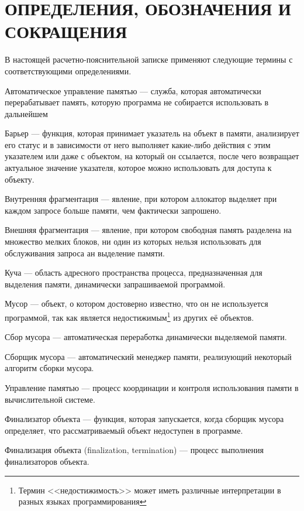 \part*{ОПРЕДЕЛЕНИЯ, ОБОЗНАЧЕНИЯ И\\СОКРАЩЕНИЯ}
В настоящей расчетно-пояснительной записке применяют следующие термины с соответствующими определениями.

\begin{enumdescript}
	\item[Автоматическое управление памятью] --- служба, которая автоматически перерабатывает память, которую программа не собирается использовать в дальнейшем
	\item[Барьер] --- функция, которая принимает указатель на объект в памяти, анализирует его статус и в зависимости от него выполняет какие-либо действия с этим указателем или даже с объектом, на который он ссылается, после чего возвращает актуальное значение указателя, которое можно использовать для доступа к объекту.
	\item[Внутренняя фрагментация] --- явление, при котором аллокатор выделяет при каждом запросе больше памяти, чем фактически запрошено.
	\item[Внешняя фрагментация] --- явление, при котором свободная память разделена на множество мелких блоков, ни один из которых нельзя использовать для обслуживания запроса ан выделение памяти.
	\item[Куча] --- область адресного пространства процесса, предназначенная для выделения памяти, динамически запрашиваемой программой.
	\item[Мусор] --- объект, о котором достоверно известно, что он не используется программой, так как является недостижимым\footnote{Термин <<недостижимость>> может иметь различные интерпретации в разных языках программирования} из других её объектов.
	\item[Сбор мусора] --- автоматическая переработка динамически выделяемой памяти.
	\item[Сборщик мусора] --- автоматический менеджер памяти, реализующий некоторый алгоритм сборки мусора.
	\item[Управление памятью] --- процесс координации и контроля использования памяти в вычислительной системе.
	\item[Финализатор объекта] --- функция, которая запускается, когда сборщик мусора определяет, что рассматриваемый объект недоступен в программе.
	\item[Финализация объекта] (finalization, termination) --- процесс выполнения финализаторов объекта.
\end{enumdescript}
